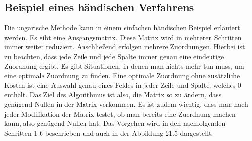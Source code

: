 \subsection{Beispiel eines händischen Verfahrens
\label{munkres:subsection:malorum}}

Die ungarische Methode kann in einem einfachen händischen Beispiel erläutert werden. Es gibt eine Ausgangsmatrix. Diese Matrix wird in mehreren Schritten immer weiter reduziert. Anschließend erfolgen mehrere Zuordnungen. Hierbei ist zu beachten, dass jede Zeile und jede Spalte immer genau eine eindeutige Zuordnung ergibt. Es gibt Situationen, in denen man nichts mehr tun muss, um eine optimale Zuordnung zu finden. Eine optimale Zuordnung ohne zusätzliche Kosten ist eine Auswahl genau eines Feldes in jeder Zeile und Spalte, welches 0 enthält. Das Ziel des Algorithmus ist also, die Matrix so zu ändern, dass genügend Nullen in der Matrix vorkommen. Es ist zudem wichtig, dass man nach jeder Modifikation der Matrix testet, ob man bereits eine Zuordnung machen kann, also genügend Nullen hat.
Das Vorgehen wird in den nachfolgenden Schritten 1-6 beschrieben und auch in der Abbildung 21.5 dargestellt.

